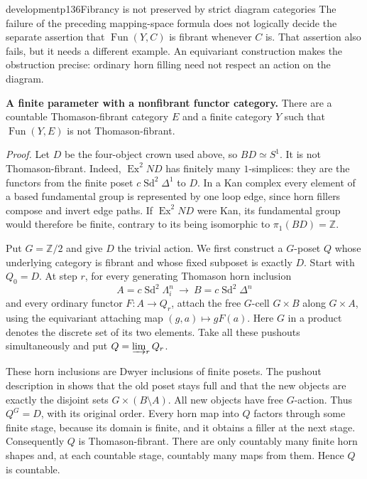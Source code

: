 \begin{dcomment}{development}{p136}{Fibrancy is not preserved by strict diagram categories}
The failure of the preceding mapping-space formula does not logically decide the separate assertion that $\operatorname{Fun}(Y,C)$ is fibrant whenever $C$ is. That assertion also fails, but it needs a different example. An equivariant construction makes the obstruction precise: ordinary horn filling need not respect an action on the diagram.

\textbf{A finite parameter with a nonfibrant functor category.}\ours\quad
There are a countable Thomason-fibrant category $E$ and a finite category $Y$ such that $\operatorname{Fun}(Y,E)$ is not Thomason-fibrant.

\emph{Proof.} Let $D$ be the four-object crown used above, so $BD\simeq S^1$. It is not Thomason-fibrant. Indeed, $\operatorname{Ex}^2ND$ has finitely many $1$-simplices: they are the functors from the finite poset $c\operatorname{Sd}^2\Delta^1$ to $D$. In a Kan complex every element of a based fundamental group is represented by one loop edge, since horn fillers compose and invert edge paths. If $\operatorname{Ex}^2ND$ were Kan, its fundamental group would therefore be finite, contrary to its being isomorphic to $\pi_1(BD)=\mathbb Z$.

Put $G=\mathbb Z/2$ and give $D$ the trivial action. We first construct a $G$-poset $Q$ whose underlying category is fibrant and whose fixed subposet is exactly $D$. Start with $Q_0=D$. At step $r$, for every generating Thomason horn inclusion
\[
 A=c\operatorname{Sd}^2\Lambda_i^n
       \ \longrightarrow\ B=c\operatorname{Sd}^2\Delta^n
\]
and every ordinary functor $F:A\to Q_r$, attach the free $G$-cell $G\times B$ along $G\times A$, using the equivariant attaching map $(g,a)\mapsto gF(a)$. Here $G$ in a product denotes the discrete set of its two elements. Take all these pushouts simultaneously and put $Q=\varinjlim_rQ_r$.

These horn inclusions are Dwyer inclusions of finite posets. The pushout description in \citet[Lemmas~4.7--4.8]{MayZakharevichStephan2017} shows that the old poset stays full and that the new objects are exactly the disjoint sets $G\times(B\setminus A)$. All new objects have free $G$-action. Thus $Q^G=D$, with its original order. Every horn map into $Q$ factors through some finite stage, because its domain is finite, and it obtains a filler at the next stage. Consequently $Q$ is Thomason-fibrant. There are only countably many finite horn shapes and, at each countable stage, countably many maps from them. Hence $Q$ is countable.


\end{dcomment}
